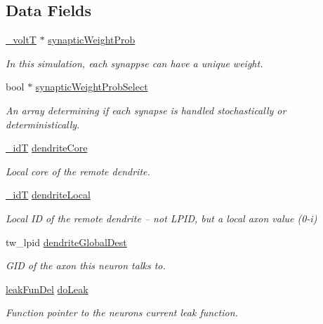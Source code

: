 \subsection*{Data Fields}
\begin{DoxyCompactItemize}
\item 
\hyperlink{assist_8h_abe1fc1b8f9efd1187e564bcb8de7f815}{\+\_\+volt\+T} $\ast$ \hyperlink{structneuron_state_af499000d57eeeaeeb6ee0928e1eee4f7}{synaptic\+Weight\+Prob}
\begin{DoxyCompactList}\small\item\em In this simulation, each synappse can have a unique weight. \end{DoxyCompactList}\item 
bool $\ast$ \hyperlink{structneuron_state_a4568f103808a436a62d7c7c47dc90e9b}{synaptic\+Weight\+Prob\+Select}
\begin{DoxyCompactList}\small\item\em An array determining if each synapse is handled stochastically or deterministically. \end{DoxyCompactList}\item 
\hyperlink{assist_8h_a3f7a6e6a1210b6d9d7a42177dcb9634b}{\+\_\+id\+T} \hyperlink{structneuron_state_a62463fa4d33c39297aa5ce3a145d474f}{dendrite\+Core}
\begin{DoxyCompactList}\small\item\em Local core of the remote dendrite. \end{DoxyCompactList}\item 
\hyperlink{assist_8h_a3f7a6e6a1210b6d9d7a42177dcb9634b}{\+\_\+id\+T} \hyperlink{structneuron_state_a73e5b16411af572181411b8fd8d5117d}{dendrite\+Local}
\begin{DoxyCompactList}\small\item\em Local I\+D of the remote dendrite -- not L\+P\+I\+D, but a local axon value (0-\/i) \end{DoxyCompactList}\item 
tw\+\_\+lpid \hyperlink{structneuron_state_a4199c14c5aabfd52f441e01623bdc84c}{dendrite\+Global\+Dest}
\begin{DoxyCompactList}\small\item\em G\+I\+D of the axon this neuron talks to. \end{DoxyCompactList}\item 
\hyperlink{structleak_fun_del}{leak\+Fun\+Del} \hyperlink{structneuron_state_aa430f424f34dc59dc27736e27ec61320}{do\+Leak}
\begin{DoxyCompactList}\small\item\em Function pointer to the neuron\textquotesingle{}s current leak function. \end{DoxyCompactList}\item 

\end{DoxyCompactItemize}
